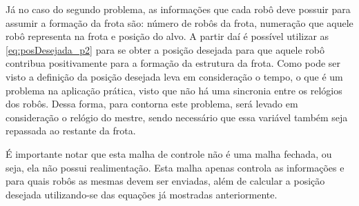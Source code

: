 Já no caso do segundo problema, as informações que cada robô deve possuir para assumir a formação da frota são: número de robôs da frota, numeração que aquele robô representa na frota e posição do alvo. A partir daí é possível utilizar as \autoref{eq:posDesejada_p2} para se obter a posição desejada para que aquele robô contribua positivamente para a formação da estrutura da frota. Como pode ser visto a definição da posição desejada leva em consideração o tempo, o que é um problema na aplicação prática, visto que não há uma sincronia entre os relógios dos robôs. Dessa forma, para contorna este problema, será levado em consideração o relógio do mestre, sendo necessário que essa variável também seja repassada ao restante da frota. 

É importante notar que esta malha de controle não é uma malha fechada, ou seja, ela não possui realimentação. Esta malha apenas controla as informações e para quais robôs as mesmas devem ser enviadas, além de calcular a posição desejada utilizando-se das equações já mostradas anteriormente. 










 

